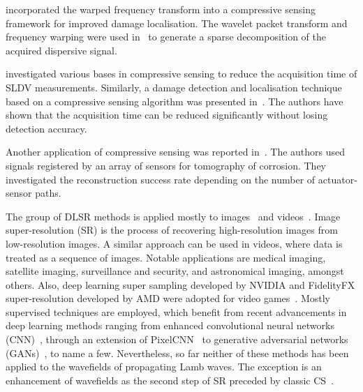 \textcite{Perelli2012} incorporated the warped frequency transform into a compressive sensing framework for improved damage localisation.
The wavelet packet transform and frequency warping were used in~\cite{Perelli2015} to generate a sparse decomposition of the acquired dispersive signal.

\textcite{DiIanni2015} investigated various bases in compressive sensing to reduce the acquisition time of SLDV measurements.
Similarly, a damage detection and localisation technique based on a compressive sensing algorithm was presented in~\cite{KeshmiriEsfandabadi2018}.
The authors have shown that the acquisition time can be reduced significantly without losing detec\-tion accuracy.

Another application of compressive sensing was reported in~\cite{Chang2020}. 
The authors used signals registered by an array of sensors for tomography of corrosion.
They investigated the reconstruction success rate depending on the number of actuator-sensor paths.

The group of DLSR methods is applied mostly to images~\cite{Dahl2017,Zhang2018,Wang2019} and videos~\cite{Zhang2017,Yan2019}.
Image super-resolution (SR) is the process of recovering high-resolution images from low-resolution images.
A similar approach can be used in videos, where data is treated as a sequence of images.
Notable applications are medical imaging, satellite imaging, surveillance and security, and astronomical imaging, amongst others.
Also, deep learning super sampling developed by NVIDIA and FidelityFX super-resolution developed by AMD were adopted for video games~\cite{Claypool2006}.
Mostly supervised techniques are employed, which benefit from recent advancements in deep learning methods ranging from enhanced convolutional neural networks (CNN)~\cite{Zhang2017}, through an extension of PixelCNN~\cite{Dahl2017} to generative adversarial networks (GANs)~\cite{Wang2019}, to name a few.
Neverthe\-less, so far neither of these methods has been applied to the wavefields of propagating Lamb waves.
The exception is an enhancement of wavefields as the second step of SR preceded by classic CS~\cite{Park2017a,KeshmiriEsfandabadi2020}.